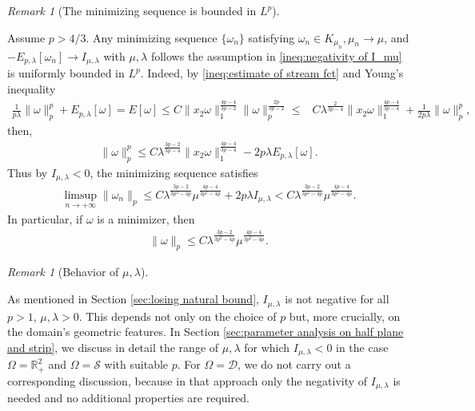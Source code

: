 \documentclass[11pt,letterpaper]{amsart}
\theoremstyle{definition}
\theoremstyle{remark}
\newtheorem{remark}[thm]{Remark}
\newcommand{\D}{\mathcal{D}}
\renewcommand{\S}{\mathcal{S}}
\newcommand{\R}{\mathbb{R}}
\renewcommand{\O}{\Omega}
\numberwithin{equation}{section}
\begin{document}
\rightline{$\Box$}

\begin{remark}[The minimizing sequence is bounded in $L^p$]\label{remark:uniformly bounded}
\end{remark}
Assume $p>4/3$. Any minimizing sequence $\{\omega_n\}$ satisfying $\omega_n\in K_{\mu_n}, \mu_n\rightarrow \mu$, and $-E_{p,\lambda}[\omega_n]\rightarrow I_{\mu,\lambda}$ with $\mu, \lambda$ follows the assumption in \eqref{ineq:negativity of I_mu} is uniformly bounded in $L^p$. Indeed, by \eqref{ineq:estimate of stream fct} and Young’s inequality
    \begin{align*}
        \frac{1}{p\lambda}\|\omega\|_{p}^p+E_{p,\lambda}[\omega]
        = E[\omega] \leq C\|x_2\omega\|_1^{\frac{4p-4}{3p-2}}\|\omega\|_p^{\frac{2p}{3p-2}} \leq & C\lambda^{\frac{2}{3p-4}}\|x_2\omega\|_1^{\frac{4p-4}{3p-4}}+\frac{1}{2p\lambda}\|\omega\|_p^p,
    \end{align*}
    then, 
    \begin{align*}
        \|\omega\|_{p}^p\leq C\lambda^{\frac{3p-2}{3p-4}}\|x_2\omega\|_1^{\frac{4p-4}{3p-4}}-2p\lambda E_{p,\lambda}[\omega].
    \end{align*}
    Thus by $I_{\mu,\lambda}<0$, the minimizing sequence satisfies 
    \begin{align}
        \limsup_{n\rightarrow +\infty}\|\omega_n\|_{p}\leq C\lambda^{\frac{3p-2}{3p^2-4p}}\mu^{\frac{4p-4}{3p^2-4p}} + 2p\lambda I_{\mu,\lambda} < C\lambda^{\frac{3p-2}{3p^2-4p}}\mu^{\frac{4p-4}{3p^2-4p}}. 
        \label{ineq:minimizing seq uniformly bounded}
    \end{align}
    In particular, if $\omega$ is a minimizer, then 
    \begin{align}
        \|\omega\|_{p}\leq C\lambda^{\frac{3p-2}{3p^2-4p}}\mu^{\frac{4p-4}{3p^2-4p}}. \label{ineq:uniformly bounded}
    \end{align}

\begin{remark}[Behavior of $\mu,\lambda$]\label{remark:Behavior of mu, lambda}
\end{remark}
As mentioned in Section \ref{sec:losing natural bound}, $I_{\mu,\lambda}$ is not negative for all $p>1$, $\mu,\lambda>0$. This depends not only on the choice of $p$ but, more crucially, on the domain's geometric features. In Section \ref{sec:parameter analysis on half plane and strip}, we discuss in detail the range of $\mu,\lambda$ for which $I_{\mu,\lambda}<0$ in the case $\O=\R^2_+$ and $\O=\S$ with suitable $p$. For $\Omega=\D$, we do not carry out a corresponding discussion, because in that approach only the negativity of $I_{\mu,\lambda}$ is needed and no additional properties are required.
\end{document}
